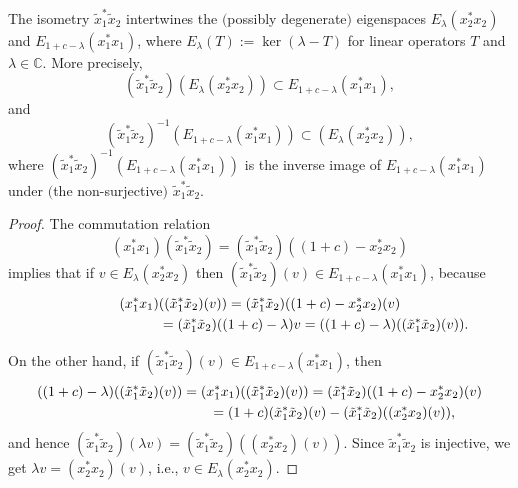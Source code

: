 \documentclass[pdftex]{sigma}
\begin{document}
\begin{proposition}\label{eigen-intertwine} The isometry $\tilde{x}_{1}^{\ast}\tilde{x}_{2}$
intertwines the $($possibly degenerate$)$ eigenspaces $E_{\lambda}(
x_{2}^{\ast}x_{2}) $ and $E_{1+c-\lambda}( x_{1}^{\ast}%
x_{1}) $, where $E_{\lambda}(T) :=\ker(\lambda-T) $ for linear operators $T$ and $\lambda\in\mathbb{C}$. More
precisely,
\[
( \tilde{x}_{1}^{\ast}\tilde{x}_{2}) ( E_{\lambda}(
x_{2}^{\ast}x_{2}) ) \subset E_{1+c-\lambda}( x_{1}^{\ast}x_{1}) ,
\]
and
\[
( \tilde{x}_{1}^{\ast}\tilde{x}_{2}) ^{-1}( E_{1+c-\lambda
}( x_{1}^{\ast}x_{1}) ) \subset( E_{\lambda}(x_{2}^{\ast}x_{2}) ),
\]
where $( \tilde{x}_{1}^{\ast}\tilde{x}_{2}) ^{-1}(
E_{1+c-\lambda}( x_{1}^{\ast}x_{1}) ) $ is the inverse
image of $E_{1+c-\lambda}( x_{1}^{\ast}x_{1}) $ under $($the
non-surjective$)$ $\tilde{x}_{1}^{\ast}\tilde{x}_{2}$.
\end{proposition}
\begin{proof} The commutation relation
\[
( x_{1}^{\ast}x_{1}) ( \tilde{x}_{1}^{\ast}\tilde{x}%
_{2}) =( \tilde{x}_{1}^{\ast}\tilde{x}_{2}) (
( 1+c) -x_{2}^{\ast}x_{2})
\]
implies that if $v\in E_{\lambda}( x_{2}^{\ast}x_{2}) $ then
$( \tilde{x}_{1}^{\ast}\tilde{x}_{2}) (v) \in
E_{1+c-\lambda}( x_{1}^{\ast}x_{1}) $, because
\begin{gather*}
( x_{1}^{\ast}x_{1}) ( ( \tilde{x}_{1}^{\ast}\tilde{x}_{2}) (v) ) =( \tilde{x}_{1}^{\ast
}\tilde{x}_{2}) ( ( 1+c) -x_{2}^{\ast}x_{2})(v)\\
\hphantom{( x_{1}^{\ast}x_{1}) ( ( \tilde{x}_{1}^{\ast}\tilde{x}_{2}) (v) )}{}
=( \tilde{x}_{1}^{\ast}\tilde{x}_{2}) ( ( 1+c)
-\lambda) v=( ( 1+c) -\lambda) (( \tilde{x}_{1}^{\ast}\tilde{x}_{2}) (v) ).
\end{gather*}

On the other hand, if $( \tilde{x}_{1}^{\ast}\tilde{x}_{2})(v) \in E_{1+c-\lambda}( x_{1}^{\ast}x_{1}) $, then
\begin{gather*}
( ( 1+c) -\lambda) ( ( \tilde{x}_{1}^{\ast}\tilde{x}_{2}) (v) ) =(
x_{1}^{\ast}x_{1}) ( ( \tilde{x}_{1}^{\ast}\tilde{x}%
_{2}) (v) ) =( \tilde{x}_{1}^{\ast}\tilde
{x}_{2}) ( ( 1+c) -x_{2}^{\ast}x_{2}) (v)\\
\hphantom{( ( 1+c) -\lambda) ( ( \tilde{x}_{1}^{\ast}\tilde{x}_{2}) (v) )}{}
=( 1+c) ( \tilde{x}_{1}^{\ast}\tilde{x}_{2}) (
v) -( \tilde{x}_{1}^{\ast}\tilde{x}_{2}) ( (
x_{2}^{\ast}x_{2}) (v) ),
\end{gather*}
and hence $( \tilde{x}_{1}^{\ast}\tilde{x}_{2}) ( \lambda
v) =( \tilde{x}_{1}^{\ast}\tilde{x}_{2}) ( (x_{2}^{\ast}x_{2}) (v) ) $. Since $\tilde{x}_{1}^{\ast}\tilde{x}_{2}$ is injective, we get $\lambda v=( x_{2}^{\ast}x_{2}) (v) $, i.e., $v\in E_{\lambda}( x_{2}^{\ast}x_{2}) $.
\end{proof}
\end{document}
